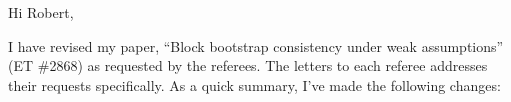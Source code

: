 \documentclass[12pt]{article}
\begin{document}
\noindent Hi Robert,

I have revised my paper, ``Block bootstrap consistency under weak
assumptions'' (ET \#2868) as requested by the referees. The letters to
each referee addresses their requests specifically. As a quick
summary, I've made the following changes:


\end{document}

